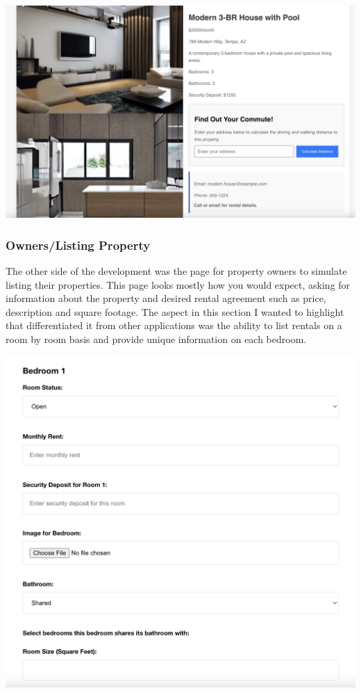 \documentclass[10pt,twocolumn]{article}
\begin{document}
\centerline{\includegraphics[scale=.15]{ListingDetail.png}}

\subsubsection{Owners/Listing Property}
The other side of the development was the page for property owners to simulate listing their properties. This page looks mostly how you would expect, asking for information about the property and desired rental agreement such as price, description and square footage. The aspect in this section I wanted to highlight that differentiated it from other applications was the ability to list rentals on a room by room basis and provide unique information on each bedroom. \\

\centerline{\includegraphics[scale=.15]{Room by Room.png}} 
\end{document}
